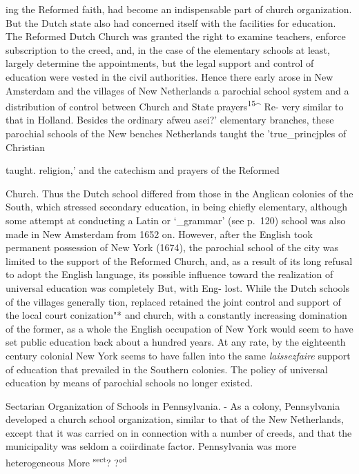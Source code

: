 \documentclass[]{book}
\begin{document}
ing the Reformed faith, had become an indispensable part of church organization. But the Dutch state also had concerned itself with the facilities for education. The Reformed Dutch Church was granted the right to examine teachers, enforce subscription to the creed, and, in the case of the elementary schools at least, largely determine the appointments, but the legal support and control of education were vested in the civil authorities. Hence there early arose in New Amsterdam and the villages of New Netherlands a parochial school system and a distribution of control between Church and State prayers\textsuperscript{15}\^{} Re- very similar to that in Holland. Besides the ordinary afweu asei?' elementary branches, these parochial schools of the New benches Netherlands taught the 'true\_princjples of Christian

taught. religion,' and the catechism and prayers of the Reformed

Church. Thus the Dutch school differed from those in the Anglican colonies of the South, which stressed secondary education, in being chiefly elementary, although some attempt at conducting a Latin or `\_grammar' (see p.~120) school was also made in New Amsterdam from 1652 on. However, after the English took permanent possession of New York (1674), the parochial school of the city was limited to the support of the Reformed Church, and, as a result of its long refusal to adopt the English language, its possible influence toward the realization of universal education was completely But, with Eng- lost. While the Dutch schools of the villages generally tion, replaced retained the joint control and support of the local court conization"* and church, with a constantly increasing domination of the former, as a whole the English occupation of New York would seem to have set public education back about a hundred years. At any rate, by the eighteenth\protect\hypertarget{ch17.xmlux5cux23para.250.1.0.box.101.249.1045.206.q.70}{}{ century colonial New York seems to have fallen into the same \emph{laissezfaire} support of education that prevailed in the Southern colonies. The policy of universal education by means of parochial schools no longer existed.}

Sectarian Organization of Schools in Pennsylvania. - As a colony, Pennsylvania developed a church school organization, similar to that of the New Netherlands, except that it was carried on in connection with a number of creeds, and that the municipality was seldom a coiirdinate factor. Pennsylvania was more heterogeneous More \textsuperscript{sect}? ?°\textsuperscript{d}
\end{document}
